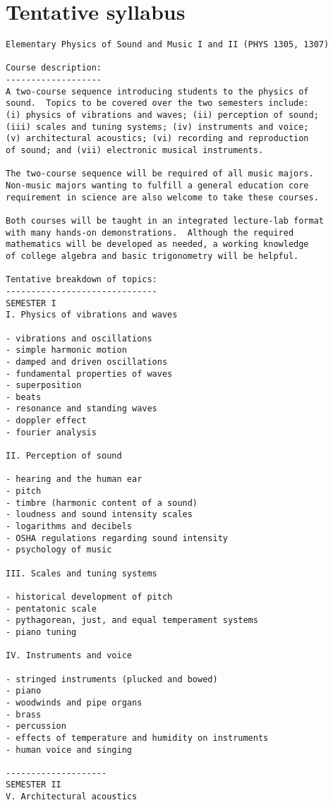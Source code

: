 \section{Tentative syllabus}

\begin{verbatim}
Elementary Physics of Sound and Music I and II (PHYS 1305, 1307)

Course description:
-------------------
A two-course sequence introducing students to the physics of
sound.  Topics to be covered over the two semesters include:
(i) physics of vibrations and waves; (ii) perception of sound; 
(iii) scales and tuning systems; (iv) instruments and voice;
(v) architectural acoustics; (vi) recording and reproduction 
of sound; and (vii) electronic musical instruments.  

The two-course sequence will be required of all music majors.
Non-music majors wanting to fulfill a general education core
requirement in science are also welcome to take these courses.  

Both courses will be taught in an integrated lecture-lab format
with many hands-on demonstrations.  Although the required 
mathematics will be developed as needed, a working knowledge 
of college algebra and basic trigonometry will be helpful.

Tentative breakdown of topics:
------------------------------
SEMESTER I
I. Physics of vibrations and waves

- vibrations and oscillations 
- simple harmonic motion
- damped and driven oscillations
- fundamental properties of waves
- superposition
- beats 
- resonance and standing waves
- doppler effect
- fourier analysis

II. Perception of sound

- hearing and the human ear
- pitch
- timbre (harmonic content of a sound)
- loudness and sound intensity scales
- logarithms and decibels
- OSHA regulations regarding sound intensity
- psychology of music

III. Scales and tuning systems

- historical development of pitch
- pentatonic scale
- pythagorean, just, and equal temperament systems
- piano tuning 

IV. Instruments and voice

- stringed instruments (plucked and bowed)
- piano 
- woodwinds and pipe organs
- brass
- percussion
- effects of temperature and humidity on instruments
- human voice and singing

--------------------
SEMESTER II
V. Architectural acoustics


\end{verbatim}
